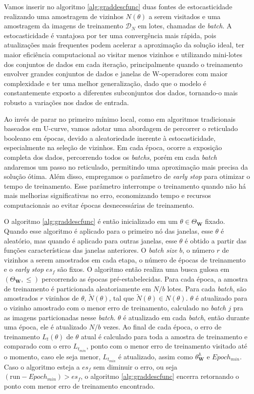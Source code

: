 Vamos inserir no algoritmo \ref{alg:graddescfunc} duas fontes de estocasticidade realizando uma amostragem de vizinhos $N \left( \theta \right)$ a serem visitados e uma amostragem da imagens de treinamento $\mathcal{D}_{N}$ em lotes, chamadas de \textit{batch}. A estocasticidade é vantajosa por ter uma convergência mais rápida, pois atualizações mais frequentes podem acelerar a aproximação da solução ideal,  ter maior eficiência computacional ao visitar menos vizinhos e utilizando mini-lotes dos conjuntos de dados em cada iteração, principalmente quando o treinamento envolver grandes conjuntos de dados e janelas de W-operadores com maior complexidade e ter uma melhor generalização, dado que o modelo é constantemente exposto a diferentes subconjuntos dos dados, tornando-o mais robusto a variações nos dados de entrada.

Ao invés de parar no primeiro mínimo local, como em algoritmos tradicionais baseados em U-curve, vamos adotar uma abordagem de percorrer o reticulado booleano em épocas, devido a aleatoriedade inerente à estocasticidade, especialmente na seleção de vizinhos. Em cada época, ocorre a exposição completa dos dados, percorrendo todos os \textit{batchs}, porém em cada \textit{batch} andaremos um passo no reticulado, permitindo uma aproximação mais precisa da solução ótima. Além disso, empregamos o parâmetro de \textit{early stop} para otimizar o tempo de treinamento. Esse parâmetro interrompe o treinamento quando não há mais melhorias significativas no erro, economizando tempo e recursos computacionais ao evitar épocas desnecessárias de treinamento.

O algoritmo \ref{alg:graddescfunc} é então inicializado em um $\theta \in \Theta_{\textbf{W}}$ fixado. Quando esse algoritmo é aplicado para o primeiro nó das janelas, esse $\theta$ é aleatório, mas quando é aplicado para outras janelas, esse $\theta$ é obtido a partir das funções características das janelas anteriores. O \textit{batch size} $b$, o número $r$ de vizinhos a serem amostrados em cada etapa, o número de épocas de treinamento e o \textit{early stop} $es_f$ são fixos. O algoritmo então realiza uma busca gulosa em $\left( \Theta_{\textbf{W}}, \leq \right)$ percorrendo as épocas pré-estabelecidas. Para cada época, a amostra de treinamento é particionada aleatoriamente em $N/b$ lotes. Para cada \textit{batch}, são amostrados $r$ vizinhos de $\theta$, $\tilde{N}\left(\theta\right) $, tal que $\tilde{N}\left(\theta\right) \in N\left(\theta\right)$. $\theta$ é atualizado para o vizinho amostrado com o menor erro de treinamento, calculado no \textit{batch} $j$ pra as imagens particionadas nesse \textit{batch}. $\theta$ é atualizado em cada \textit{batch}, então durante uma época, ele é atualizado $N/b$ vezes. Ao final de cada época, o erro de treinamento $ L_{t}\left(\theta\right)$ de $\theta$ atual é calculado para toda a amostra de treinamento e comparado com o erro $ L_{t_{min}}$, ponto com o menor erro de treinamento visitado até o momento, caso ele seja menor,  $ L_{t_{min}}$ é atualizado, assim como $\theta_{\textbf{W}}^{\mathbb{A}}$ e $Epoch_{min}$. Caso o algoritmo esteja a $es_f$ sem diminuir o erro, ou seja $(\text{run} - Epoch_{min}) > es_f$, o algoritmo \ref{alg:graddescfunc} encerra retornando o ponto com menor erro de treinamento encontrado.


